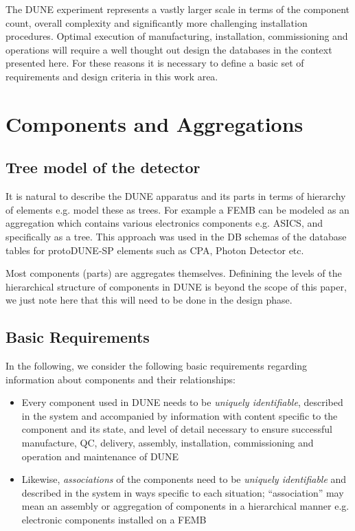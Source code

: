 \documentclass[pdftex,12pt,letter]{article}
\begin{document}
The DUNE experiment represents a vastly larger scale in terms of the component count,
overall complexity and significantly more challenging installation procedures. Optimal execution
of manufacturing, installation, commissioning and operations will require a well thought out design
the databases in the context presented here. For these reasons it is necessary to define a
basic set of requirements and design criteria in this work area.

\section{Components and Aggregations}
\subsection{Tree model of the detector}

It is natural to describe the DUNE apparatus and its parts in terms of hierarchy of elements e.g. model
these as trees. For example a FEMB can be modeled as an aggregation which contains various electronics
components e.g. ASICS, and specifically as a tree. This approach was used in the DB schemas of the
database tables for protoDUNE-SP elements such as CPA, Photon Detector etc.

Most components (parts) are aggregates themselves. Definining the levels of the hierarchical structure
of components in DUNE is beyond the scope of this paper, we just note here that this will need to be
done in the design phase.

\subsection{Basic Requirements}

In the following, we consider the following basic requirements regarding information about components and their relationships:

\begin{itemize}

\item Every component used in DUNE needs to be \textit{uniquely identifiable}, described in the
system and accompanied by information with content specific to the component and its state, and level
of detail necessary to ensure successful manufacture, QC, delivery, assembly, installation, commissioning
and operation and maintenance of DUNE

\item Likewise, \textit{associations} of the components need to be \textit{uniquely identifiable} and described
in the system in ways specific to each situation; ``association'' may mean an assembly or aggregation of
components in a hierarchical manner e.g.\,electronic components installed on a FEMB


\end{itemize}
\end{document}

